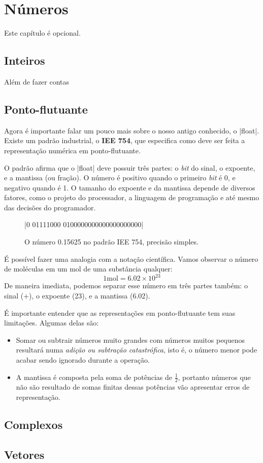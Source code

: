 \chapter[c:numeros]{Números}

    Este capítulo é opcional.

    \section*{Inteiros}

    Além de fazer contas

    \section*{Ponto-flutuante}
    
    
	
    Agora é importante falar um pouco mais sobre o nosso antigo conhecido, o |float|. Existe um padrão industrial, o \textbf{IEE 754}, que especifica como deve ser feita a representação numérica em ponto-flutuante. \par
    
    O padrão afirma que o |float| deve possuir três partes:	o \textit{bit} do sinal, o expoente, e a mantissa (ou fração). O número é positivo quando o primeiro \textit{bit} é 0, e negativo quando é 1. O tamanho do expoente e da mantissa depende de diversos fatores, como o projeto do processador, a linguagem de programação e até mesmo das decisões do programador. \par
    
    \begin{figure}[h]
        \centering
        \small
        |0 01111000 0100000000000000000000|
        \caption{O número 0.15625 no padrão IEE 754, precisão simples.}
        \label{f:iee754}
    \end{figure}
    
    É possível fazer uma analogia com a notação científica. Vamos observar o número de moléculas em um mol de uma substância qualquer:
        $$1 \text{mol} = 6.02 \times 10^{23}$$
    De maneira imediata, podemos separar esse número em três partes também: o sinal ($+$), o expoente (23), e a mantissa (6.02). \par
    
    É importante entender que as representações em ponto-flutuante tem suas limitações. Algumas delas são:
    
    \begin{itemize}
        \item Somar ou subtrair números muito grandes com números muitos pequenos resultará numa \textit{adição ou subtração catastrófica}, isto é, o número menor pode acabar sendo ignorado durante a operação.
    
        \item A mantissa é composta pela soma de potências de $\frac{1}{2}$, portanto números que não são resultado de somas finitas dessas potências vão apresentar erros de representação.
    \end{itemize}

    \section*{Complexos}

    \section*{Vetores}
    
    